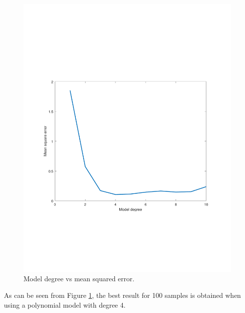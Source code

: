 \documentclass[]{article}
\begin{document}
\begin{figure}[ht]
	\centering
	\includegraphics[trim= 10cm 5cm 10cm 5cm, scale=0.4]{proj1-3_2b-mseVSdegree}
	\caption{Model degree vs mean squared error.}
	\label{fig:mseVSdeg}
\end{figure}
As can be seen from Figure \ref{fig:mseVSdeg}, the best result for 100 samples is obtained when using a polynomial model with degree 4.
\end{document}
